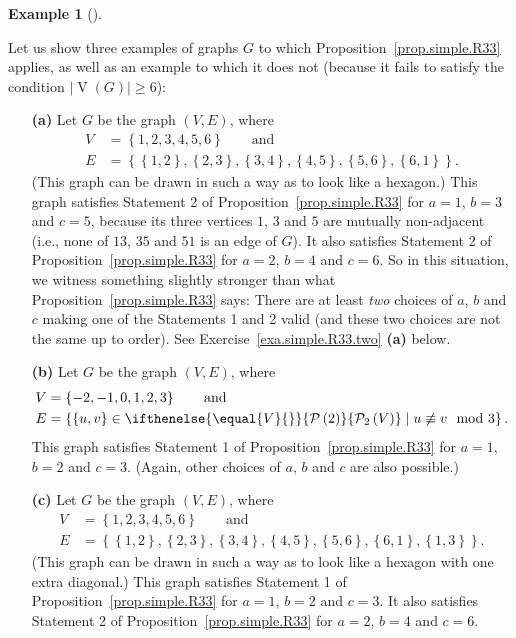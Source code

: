 \documentclass[numbers=enddot,12pt,final,onecolumn,notitlepage]{scrartcl}%
\theoremstyle{definition}
\newtheorem{exam}[theo]{Example}
\newenvironment{example}[1][]
{\begin{exam}[#1]\begin{leftbar}}
{\end{leftbar}\end{exam}}
\newcommand{\powset}[2][]{\ifthenelse{\equal{#2}{}}{\mathcal{P}\left(#1\right)}{\mathcal{P}_{#1}\left(#2\right)}}
\newcommand{\set}[1]{\left\{ #1 \right\}}
\newcommand{\abs}[1]{\left| #1 \right|}
\newcommand{\tup}[1]{\left( #1 \right)}
\newcommand{\verts}[1]{\operatorname{V}\left( #1 \right)}
\begin{document}
\begin{example} \label{exa.simple.R33}
Let us show three examples of graphs $G$ to which
Proposition~\ref{prop.simple.R33} applies, as well as an example to
which it does not (because it fails to satisfy the condition
$\abs{\verts{G}} \geq 6$):

\begin{enumerate}

\item[\textbf{(a)}] Let $G$ be the graph $\tup{V, E}$, where
\begin{align*}
V &= \set{1, 2, 3, 4, 5, 6} \qquad \text{and} \\
E &= \set{\set{1,2}, \set{2,3}, \set{3,4}, \set{4,5}, \set{5,6},
          \set{6,1}} .
\end{align*}
(This graph can be drawn in such a way as to look like a hexagon.)
This graph satisfies Statement 2 of Proposition~\ref{prop.simple.R33}
for $a=1$, $b=3$ and $c=5$,
because its three vertices $1$, $3$ and $5$ are mutually
non-adjacent (i.e., none of $13$, $35$ and $51$ is an edge of $G$).
It also satisfies Statement 2 of Proposition~\ref{prop.simple.R33}
for $a=2$, $b=4$ and $c=6$.
So in this situation, we witness something slightly stronger than what
Proposition~\ref{prop.simple.R33} says: There are at least
\textit{two} choices of $a$, $b$ and $c$ making one of the Statements
1 and 2 valid (and these two choices are not the same up to order).
See Exercise~\ref{exa.simple.R33.two} \textbf{(a)} below.

\item[\textbf{(b)}] Let $G$ be the graph $\tup{V, E}$, where
\begin{align*}
V &= \set{-2, -1, 0, 1, 2, 3} \qquad \text{and} \\
E &= \set{\set{u,v} \in \powset[2]{V} \mid u \not\equiv v \mod 3} .
\end{align*}
This graph satisfies Statement 1 of Proposition~\ref{prop.simple.R33}
for $a=1$, $b=2$ and $c=3$. (Again, other choices of $a$, $b$ and $c$
are also possible.)

\item[\textbf{(c)}] Let $G$ be the graph $\tup{V, E}$, where
\begin{align*}
V &= \set{1, 2, 3, 4, 5, 6} \qquad \text{and} \\
E &= \set{\set{1,2}, \set{2,3}, \set{3,4}, \set{4,5}, \set{5,6},
          \set{6,1}, \set{1,3}} .
\end{align*}
(This graph can be drawn in such a way as to look like a hexagon with
one extra diagonal.)
This graph satisfies Statement 1 of Proposition~\ref{prop.simple.R33}
for $a=1$, $b=2$ and $c=3$. It also satisfies Statement 2 of
Proposition~\ref{prop.simple.R33} for $a=2$, $b=4$ and $c=6$.


\end{enumerate}
\end{example}
\end{document}
